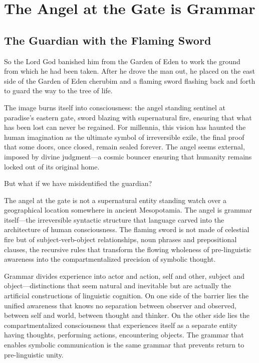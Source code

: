 \chapter{The Angel at the Gate is Grammar}

\section{The Guardian with the Flaming Sword}

So the Lord God banished him from the Garden of Eden to work the ground from which he had been taken. After he drove the man out, he placed on the east side of the Garden of Eden cherubim and a flaming sword flashing back and forth to guard the way to the tree of life.

The image burns itself into consciousness: the angel standing sentinel at paradise's eastern gate, sword blazing with supernatural fire, ensuring that what has been lost can never be regained. For millennia, this vision has haunted the human imagination as the ultimate symbol of irreversible exile, the final proof that some doors, once closed, remain sealed forever. The angel seems external, imposed by divine judgment—a cosmic bouncer ensuring that humanity remains locked out of its original home.

But what if we have misidentified the guardian?

The angel at the gate is not a supernatural entity standing watch over a geographical location somewhere in ancient Mesopotamia. The angel is grammar itself—the irreversible syntactic structure that language carved into the architecture of human consciousness. The flaming sword is not made of celestial fire but of subject-verb-object relationships, noun phrases and prepositional clauses, the recursive rules that transform the flowing wholeness of pre-linguistic awareness into the compartmentalized precision of symbolic thought.

Grammar divides experience into actor and action, self and other, subject and object—distinctions that seem natural and inevitable but are actually the artificial constructions of linguistic cognition. On one side of the barrier lies the unified awareness that knows no separation between observer and observed, between self and world, between thought and thinker. On the other side lies the compartmentalized consciousness that experiences itself as a separate entity having thoughts, performing actions, encountering objects. The grammar that enables symbolic communication is the same grammar that prevents return to pre-linguistic unity.

